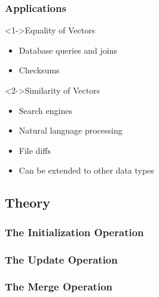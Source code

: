 \begin{frame}
  \frametitle{Applications}

  \begin{block}<1->{Equality of Vectors}
    \begin{itemize}
      \item Database queries and joins
      \item Checksums
    \end{itemize}
  \end{block}

  \begin{block}<2->{Similarity of Vectors}
    \begin{itemize}
      \item Search engines
      \item Natural language processing
      \item File diffs
      \item Can be extended to other data types
    \end{itemize}
  \end{block}
\end{frame}

\subsection{Theory}

\begin{frame}
  \frametitle{The Initialization Operation}

  
\end{frame}

\begin{frame}
  \frametitle{The Update Operation}

  
\end{frame}

\begin{frame}
  \frametitle{The Merge Operation}

  
\end{frame}

